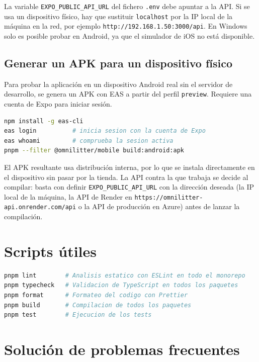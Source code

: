 La variable \texttt{EXPO\_PUBLIC\_API\_URL} del fichero \texttt{.env} debe apuntar a la
API. Si se usa un dispositivo físico, hay que sustituir \texttt{localhost} por la IP
local de la máquina en la red, por ejemplo \texttt{http://192.168.1.50:3000/api}. En
Windows solo es posible probar en Android, ya que el simulador de iOS no está
disponible.

\subsection*{Generar un APK para un dispositivo físico}

Para probar la aplicación en un dispositivo Android real sin el servidor de desarrollo,
se genera un APK con EAS a partir del perfil \texttt{preview}. Requiere una cuenta de
Expo para iniciar sesión.

\begin{lstlisting}[language=bash]
npm install -g eas-cli
eas login          # inicia sesion con la cuenta de Expo
eas whoami         # comprueba la sesion activa
pnpm --filter @omnilitter/mobile build:android:apk
\end{lstlisting}

El APK resultante usa distribución interna, por lo que se instala directamente en el
dispositivo sin pasar por la tienda. La API contra la que trabaja se decide al compilar:
basta con definir \texttt{EXPO\_PUBLIC\_API\_URL} con la dirección deseada (la IP local
de la máquina, la API de Render en \texttt{https://omnilitter-api.onrender.com/api} o la
API de producción en Azure) antes de lanzar la compilación.

\section{Scripts útiles}

\begin{lstlisting}[language=bash]
pnpm lint        # Analisis estatico con ESLint en todo el monorepo
pnpm typecheck   # Validacion de TypeScript en todos los paquetes
pnpm format      # Formateo del codigo con Prettier
pnpm build       # Compilacion de todos los paquetes
pnpm test        # Ejecucion de los tests
\end{lstlisting}

\section{Solución de problemas frecuentes}

